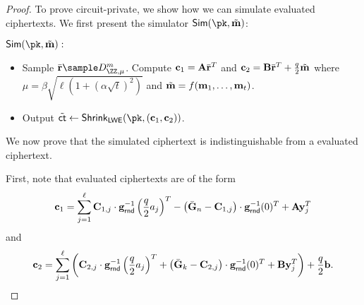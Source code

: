 \begin{proof}
To prove circuit-private, we show how we can simulate evaluated ciphertexts. We first present the simulator $\Sim(\pk,\tilde\mn)$:
\begin{description}
\item $\Sim(\pk,\tilde \mn):$
\begin{itemize}
    \item Sample $\bar \rn\sample D_{\ZZ,\mu}^m$. Compute $\mathbf{c}_1=\mathbf{A}\bar{\mathbf{r}}^T$ and $\mathbf{c}_2=\mathbf{B}\bar{\mathbf{r}}^T +\frac{q}{2} \tilde {\mathbf{m}}$ where $\mu=\beta\sqrt{\ell\left(1+\left(\alpha\sqrt{t}\right)^2\right)}$ and $\tilde {\mathbf{m}}=f(\mathbf{m}_1,\dots, \mathbf{m}_t)$.
    \item Output $\tilde\ct\leftarrow\mathsf{Shrink}_\mathsf{LWE}(\pk,(\cn_1,\cn_2))$.
\end{itemize}
\end{description}

We now prove that the simulated ciphertext is indistinguishable from a evaluated ciphertext.




First, note that evaluated ciphertexts are of the form $$\mathbf{c}_1=\sum_{j=1}^\ell \mathbf{C}_{1,j}\cdot \mathbf{g}^{-1}_{\mathsf{rnd}}\left( \frac{q}{2}  a_j\right)^T-\left( \bar {\mathbf{G}}_n-\mathbf{C}_{1,j}\right)\cdot\mathbf{g}^{-1}_\mathsf{rnd}(0)^T + \mathbf{A}\mathbf{y}_j^T$$ and $$\mathbf{c}_2=\sum_{j=1}^\ell\left( \mathbf{C}_{2,j}\cdot\mathbf{g}^{-1}_{\mathsf{rnd}}\left( \frac{q}{2} a_j\right)^T  + \left(\bar {\mathbf{G}}_k-\mathbf{C}_{2,j}\right)\cdot\mathbf{g}^{-1}_\mathsf{rnd}(0)^T+\mathbf{B}\mathbf{y}_j^T\right)+ \frac{q}{2}  \mathbf{b}.$$


\end{proof}
